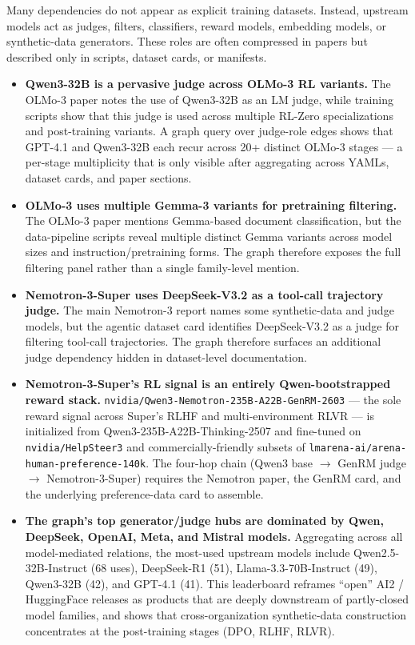 Many dependencies do not appear as explicit training datasets. Instead, upstream models act as judges, filters, classifiers, reward models, embedding models, or synthetic-data generators. These roles are often compressed in papers but described only in scripts, dataset cards, or manifests.

\begin{itemize}
    \item \textbf{Qwen3-32B is a pervasive judge across OLMo-3 RL variants.}
    The OLMo-3 paper notes the use of Qwen3-32B as an LM judge, while training scripts show that this judge is used across multiple RL-Zero specializations and post-training variants. A graph query over judge-role edges shows that GPT-4.1 and Qwen3-32B each recur across 20+ distinct OLMo-3 stages --- a per-stage multiplicity that is only visible after aggregating across YAMLs, dataset cards, and paper sections.

    \item \textbf{OLMo-3 uses multiple Gemma-3 variants for pretraining filtering.}
    The OLMo-3 paper mentions Gemma-based document classification, but the data-pipeline scripts reveal multiple distinct Gemma variants across model sizes and instruction/pretraining forms. The graph therefore exposes the full filtering panel rather than a single family-level mention.

    \item \textbf{Nemotron-3-Super uses DeepSeek-V3.2 as a tool-call trajectory judge.}
    The main Nemotron-3 report names some synthetic-data and judge models, but the agentic dataset card identifies DeepSeek-V3.2 as a judge for filtering tool-call trajectories. The graph therefore surfaces an additional judge dependency hidden in dataset-level documentation.

    \item \textbf{Nemotron-3-Super's RL signal is an entirely Qwen-bootstrapped reward stack.}
    \texttt{nvidia/Qwen3-Nemotron-235B-A22B-GenRM-2603} --- the sole reward signal across Super's RLHF and multi-environment RLVR --- is initialized from Qwen3-235B-A22B-Thinking-2507 and fine-tuned on \texttt{nvidia/HelpSteer3} and commercially-friendly subsets of \texttt{lmarena-ai/arena-human-preference-140k}. The four-hop chain (Qwen3 base $\rightarrow$ GenRM judge $\rightarrow$ Nemotron-3-Super) requires the Nemotron paper, the GenRM card, and the underlying preference-data card to assemble.

    \item \textbf{The graph's top generator/judge hubs are dominated by Qwen, DeepSeek, OpenAI, Meta, and Mistral models.}
    Aggregating across all model-mediated relations, the most-used upstream models include Qwen2.5-32B-Instruct (68 uses), DeepSeek-R1 (51), Llama-3.3-70B-Instruct (49), Qwen3-32B (42), and GPT-4.1 (41). This leaderboard reframes ``open'' AI2 / HuggingFace releases as products that are deeply downstream of partly-closed model families, and shows that cross-organization synthetic-data construction concentrates at the post-training stages (DPO, RLHF, RLVR).
\end{itemize}

